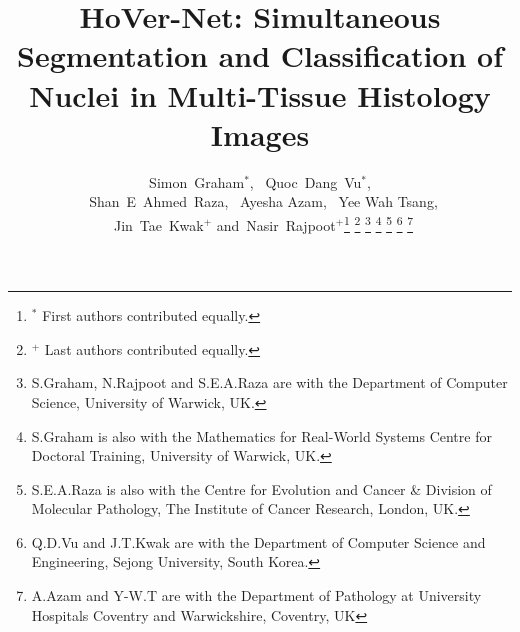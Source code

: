 \documentclass[journal]{IEEEtran}
\begin{document}


\title{HoVer-Net: Simultaneous Segmentation and Classification of Nuclei in Multi-Tissue Histology Images}
	


	
	
	\author{Simon~Graham$^*$, ~Quoc~Dang~Vu$^*$, \\ ~Shan~E~Ahmed~Raza, ~Ayesha Azam, ~Yee Wah Tsang, \\ ~Jin~Tae~Kwak$^+$
		and~Nasir~Rajpoot$^+$\thanks{$^*$ First authors contributed equally.}
		\thanks{$^+$ Last authors contributed equally.}
		\thanks{S.Graham, N.Rajpoot and S.E.A.Raza are with the Department of Computer Science, University of Warwick, UK.}
		\thanks{S.Graham is also with the Mathematics for Real-World Systems Centre for Doctoral Training, University of Warwick, UK.}
		\thanks{S.E.A.Raza is also with the Centre for Evolution and Cancer \& Division of Molecular Pathology, The Institute of Cancer Research, London, UK.}
		\thanks{Q.D.Vu and J.T.Kwak are with the Department of Computer Science and Engineering, Sejong University, South Korea.}
		\thanks{A.Azam and Y-W.T are with the Department of Pathology at University Hospitals Coventry and Warwickshire, Coventry, UK}
		}
	


	
	


	
	
	


	
	


	
	
	
\maketitle
	
\end{document}
